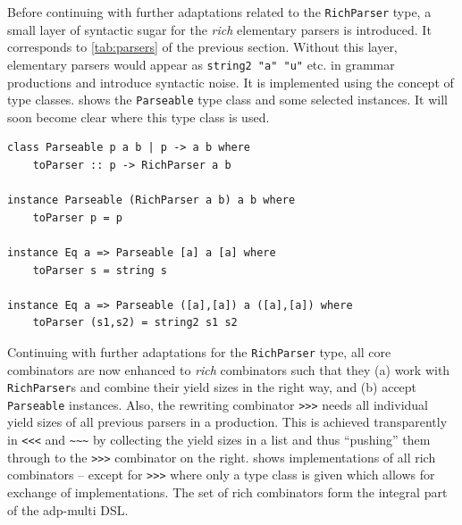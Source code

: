 \documentclass[
    a4paper,
    12pt,
    twoside,
    BCOR=12mm,
    parskip=half,
    chapterprefix,
    numbers=noenddot,
    bibliography=totoc
]{scrbook}
\begin{document}
Before continuing with further adaptations related to the \verb|RichParser| type, a small layer of syntactic sugar for the \emph{rich} elementary parsers is introduced. It corresponds to \cref{tab:parsers} of the previous section. Without this layer, elementary parsers would appear as \verb|string2 "a" "u"| etc. in grammar productions and introduce syntactic noise. It is implemented using the concept of type classes.  shows the \verb|Parseable| type class and some selected instances. It will soon become clear where this type class is used.

\begin{lstlisting}[label=lst:parseable,caption=\texttt{Parseable} type class and instances]
class Parseable p a b | p -> a b where
    toParser :: p -> RichParser a b
    
instance Parseable (RichParser a b) a b where
    toParser p = p
    
instance Eq a => Parseable [a] a [a] where
    toParser s = string s
    
instance Eq a => Parseable ([a],[a]) a ([a],[a]) where
    toParser (s1,s2) = string2 s1 s2
\end{lstlisting}

Continuing with further adaptations for the \verb|RichParser| type, all core combinators are now enhanced to \emph{rich} combinators such that they (a) work with \verb|RichParser|s and combine their yield sizes in the right way, and (b) accept \verb|Parseable| instances. Also, the rewriting combinator \verb|>>>| needs all individual yield sizes of all previous parsers in a production. This is achieved transparently in \verb|<<<| and \verb|~~~| by collecting the yield sizes in a list and thus ``pushing'' them through to the \verb|>>>| combinator on the right.  shows implementations of all rich combinators -- except for \verb|>>>| where only a type class is given which allows for exchange of implementations. The set of rich combinators form the integral part of the adp-multi \gls{DSL}.
\end{document}

